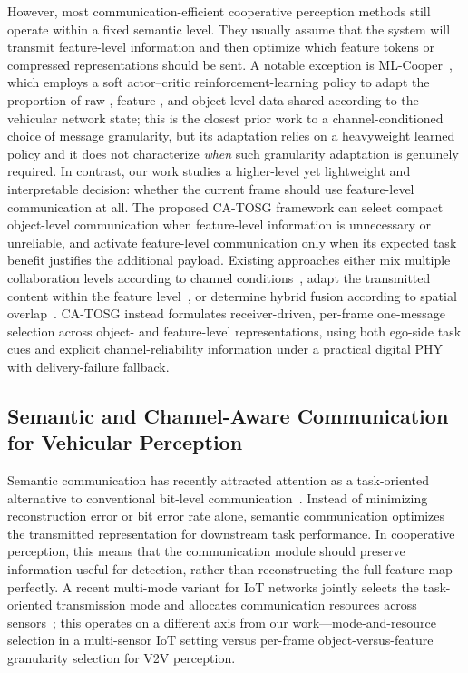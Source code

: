 \documentclass[journal]{IEEEtran}
\newcommand{\method}{CA-TOSG}
\begin{document}
However, most communication-efficient cooperative perception methods still operate within a fixed semantic level. They usually assume that the system will transmit feature-level information and then optimize which feature tokens or compressed representations should be sent. A notable exception is ML-Cooper~\cite{xie2022mlcooper}, which employs a soft actor--critic reinforcement-learning policy to adapt the proportion of raw-, feature-, and object-level data shared according to the vehicular network state; this is the closest prior work to a channel-conditioned choice of message granularity, but its adaptation relies on a heavyweight learned policy and it does not characterize \emph{when} such granularity adaptation is genuinely required. In contrast, our work studies a higher-level yet lightweight and interpretable decision: whether the current frame should use feature-level communication at all. The proposed \method{} framework can select compact object-level communication when feature-level information is unnecessary or unreliable, and activate feature-level communication only when its expected task benefit justifies the additional payload. Existing approaches either mix multiple collaboration levels according to channel conditions~\cite{xie2022mlcooper}, adapt the transmitted content within the feature level~\cite{hu2022where2comm,sheng2024importance}, or determine hybrid fusion according to spatial overlap~\cite{liu2024rbh}. \method{} instead formulates receiver-driven, per-frame one-message selection across object- and feature-level representations, using both ego-side task cues and explicit channel-reliability information under a practical digital PHY with delivery-failure fallback.

\subsection{Semantic and Channel-Aware Communication for Vehicular Perception}

Semantic communication has recently attracted attention as a task-oriented alternative to conventional bit-level communication~\cite{sheng2024importance,gan2026scomcp,bourtsoulatze2019deepjscc,xie2021deepsc,gunduz2023beyond}. Instead of minimizing reconstruction error or bit error rate alone, semantic communication optimizes the transmitted representation for downstream task performance. In cooperative perception, this means that the communication module should preserve information useful for detection, rather than reconstructing the full feature map perfectly. A recent multi-mode variant for IoT networks jointly selects the task-oriented transmission mode and allocates communication resources across sensors~\cite{yuan2025multimode}; this operates on a different axis from our work---mode-and-resource selection in a multi-sensor IoT setting versus per-frame object-versus-feature granularity selection for V2V perception.
\end{document}
